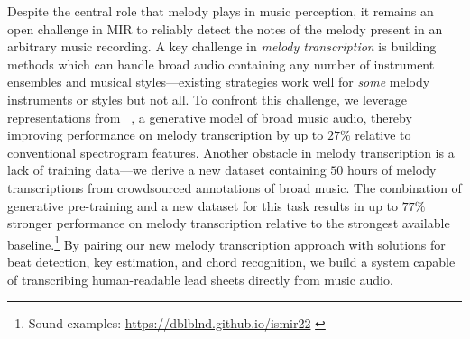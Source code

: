 Despite the central role that melody plays in music perception, 
it remains an open challenge in MIR to reliably detect the notes of the melody present in an arbitrary music recording. 
A key challenge in \emph{melody transcription} is building methods which can handle broad audio containing any number of instrument ensembles and musical styles---existing strategies work well for \emph{some} melody instruments or styles but not all. 
To confront this challenge, we leverage representations from \jukebox{}~\cite{dhariwal2020jukebox}, 
a generative model of broad music audio, 
thereby improving performance on melody transcription by 
up to $27$\% 
relative to conventional spectrogram features. 
Another obstacle in melody transcription is a lack of training data---we derive a new dataset containing $50$ hours of melody transcriptions from crowdsourced annotations of broad music. 
The combination of generative pre-training and a new dataset for this task results in up to $77\%$ stronger performance on melody transcription relative to the strongest available baseline.\footnote{Sound examples: \url{https://dblblnd.github.io/ismir22} %
\label{sound_examples}} 
By pairing our new melody transcription approach with solutions for beat detection, key estimation, and chord recognition, 
we build a system capable of transcribing human-readable lead sheets directly from music audio.